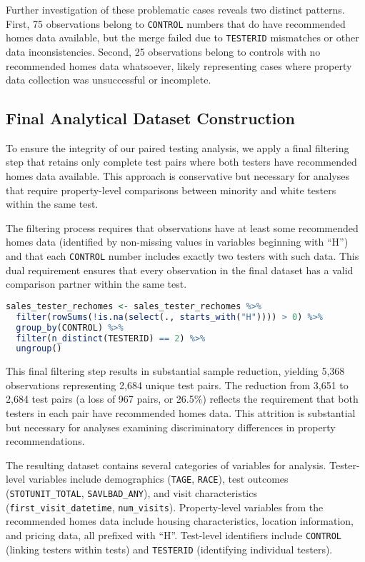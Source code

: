 \documentclass{article}
\begin{document}
Further investigation of these problematic cases reveals two distinct patterns. First, 75 observations belong to \texttt{CONTROL} numbers that do have recommended homes data available, but the merge failed due to \texttt{TESTERID} mismatches or other data inconsistencies. Second, 25 observations belong to controls with no recommended homes data whatsoever, likely representing cases where property data collection was unsuccessful or incomplete.

\subsection{Final Analytical Dataset Construction}

To ensure the integrity of our paired testing analysis, we apply a final filtering step that retains only complete test pairs where both testers have recommended homes data available. This approach is conservative but necessary for analyses that require property-level comparisons between minority and white testers within the same test.

The filtering process requires that observations have at least some recommended homes data (identified by non-missing values in variables beginning with ``H'') and that each \texttt{CONTROL} number includes exactly two testers with such data. This dual requirement ensures that every observation in the final dataset has a valid comparison partner within the same test.

\begin{lstlisting}[language=R]
sales_tester_rechomes <- sales_tester_rechomes %>%
  filter(rowSums(!is.na(select(., starts_with("H")))) > 0) %>%
  group_by(CONTROL) %>%
  filter(n_distinct(TESTERID) == 2) %>%
  ungroup()
\end{lstlisting}

This final filtering step results in substantial sample reduction, yielding 5,368 observations representing 2,684 unique test pairs. The reduction from 3,651 to 2,684 test pairs (a loss of 967 pairs, or 26.5\%) reflects the requirement that both testers in each pair have recommended homes data. This attrition is substantial but necessary for analyses examining discriminatory differences in property recommendations.

The resulting dataset contains several categories of variables for analysis. Tester-level variables include demographics (\texttt{TAGE}, \texttt{RACE}), test outcomes (\texttt{STOTUNIT\_TOTAL}, \texttt{SAVLBAD\_ANY}), and visit characteristics (\texttt{first\_visit\_datetime}, \texttt{num\_visits}). Property-level variables from the recommended homes data include housing characteristics, location information, and pricing data, all prefixed with ``H''. Test-level identifiers include \texttt{CONTROL} (linking testers within tests) and \texttt{TESTERID} (identifying individual testers).
\end{document}
